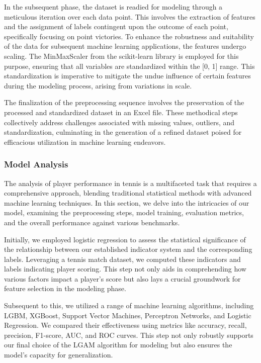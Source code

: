 \documentclass{article}
\begin{document}
In the subsequent phase, the dataset is readied for modeling through a meticulous iteration over each data point. This involves the extraction of features and the assignment of labels contingent upon the outcome of each point, specifically focusing on point victories. To enhance the robustness and suitability of the data for subsequent machine learning applications, the features undergo scaling. The MinMaxScaler from the scikit-learn library is employed for this purpose, ensuring that all variables are standardized within the [0, 1] range. This standardization is imperative to mitigate the undue influence of certain features during the modeling process, arising from variations in scale.

The finalization of the preprocessing sequence involves the preservation of the processed and standardized dataset in an Excel file. These methodical steps collectively address challenges associated with missing values, outliers, and standardization, culminating in the generation of a refined dataset poised for efficacious utilization in machine learning endeavors.
\subsubsection{Model Analysis}
The analysis of player performance in tennis is a multifaceted task that requires a comprehensive approach, blending traditional statistical methods with advanced machine learning techniques. In this section, we delve into the intricacies of our model, examining the preprocessing steps, model training, evaluation metrics, and the overall performance against various benchmarks.

Initially, we employed logistic regression to assess the statistical significance of the relationship between our established indicator system and the corresponding labels. Leveraging a tennis match dataset, we computed these indicators and labels indicating player scoring. This step not only aids in comprehending how various factors impact a player's score but also lays a crucial groundwork for feature selection in the modeling phase.

Subsequent to this, we utilized a range of machine learning algorithms, including LGBM, XGBoost, Support Vector Machines, Perceptron Networks, and Logistic Regression. We compared their effectiveness using metrics like accuracy, recall, precision, F1-score, AUC, and ROC curves. This step not only robustly supports our final choice of the LGAM algorithm for modeling but also ensures the model's capacity for generalization.
\end{document}
